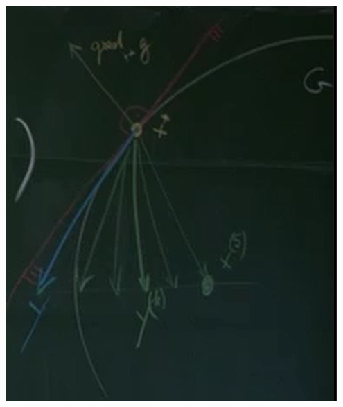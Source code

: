 \begin{enumerate}
\begin{itemize}
             \begin{center} \includegraphics[scale=0.5]{png2}
         \end{center}




\end{itemize}
\end{enumerate}
